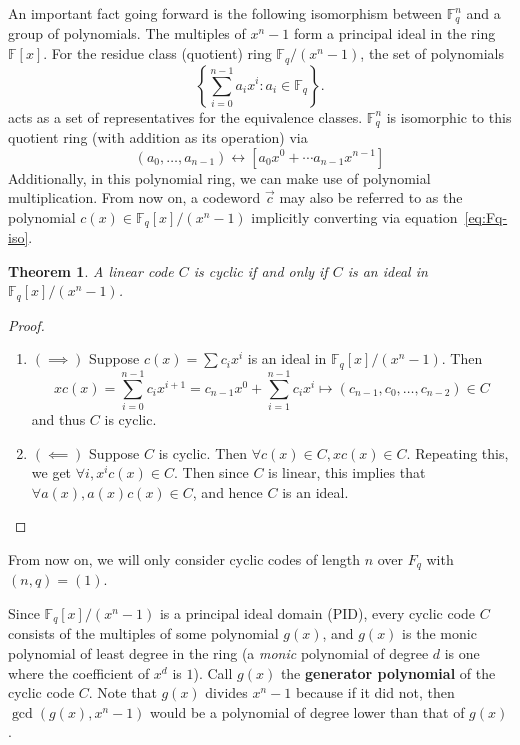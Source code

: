 \documentclass{article}
\newcommand{\F}{\mathbb{F}}
\newcommand{\mt}{\mapsto}
\renewcommand{\=}{\equiv}
\newcommand{\set}[1]{\left\{ #1 \right\}}
\renewcommand{\v}{\vec}
\theoremstyle{plain}
\newtheorem{thm}{Theorem}[subsection]
\theoremstyle{definition}
\begin{document}
An important fact going forward is the following isomorphism between $\F_q^n$ and a group of polynomials.
The multiples of $x^n - 1$ form a principal ideal in the ring $\F[x]$.
For the residue class (quotient) ring $\F_q / (x^n - 1)$, the set of polynomials
$$ \set{ \sum_{i=0}^{n-1} a_i x^i : a_i \in \F_q }. $$
acts as a set of representatives for the equivalence classes.
$\F_q^n$ is isomorphic to this quotient ring (with addition as its operation) via
\begin{equation}
  \label{eq:Fq-iso}
  (a_0, \dots, a_{n-1}) \leftrightarrow [a_0 x^0 + \cdots a_{n-1} x^{n-1}]
\end{equation}
Additionally, in this polynomial ring, we can make use of polynomial multiplication.
From now on, a codeword $\v c$ may also be referred to as the polynomial $c(x) \in \F_q[x] / (x^n-1)$ implicitly converting via equation~\ref{eq:Fq-iso}.

\begin{thm}
  A linear code $C$ is cyclic if and only if $C$ is an ideal in $\F_q[x]/(x^n-1)$.
\end{thm}
\begin{proof}\hspace{0em}
\begin{enumerate}
\item[]
$(\implies)$
Suppose $c(x) = \sum c_i x^i$ is an ideal in $\F_q[x]/(x^n-1)$.
Then
$$ x c(x) = \sum_{i=0}^{n-1} c_i x^{i+1} = c_{n-1} x^0 + \sum_{i=1}^{n-1} c_i x^{i} \mt (c_{n-1}, c_0, \dots, c_{n-2}) \in C $$
and thus $C$ is cyclic.

\item[]
$(\impliedby)$
Suppose $C$ is cyclic.
Then $\forall c(x) \in C, x c(x) \in C$.
Repeating this, we get $\forall i, x^i c(x) \in C$.
Then since $C$ is linear, this implies that $\forall a(x), a(x) c(x) \in C$,
and hence $C$ is an ideal.
\end{enumerate}
\end{proof}

\noindent
From now on, we will only consider cyclic codes of length $n$ over $F_q$ with $(n, q) = (1)$.
\vspace{1em}

Since $\F_q[x]/(x^n-1)$ is a principal ideal domain (PID), every cyclic code $C$ consists of the multiples of some polynomial $g(x)$, and $g(x)$ is the monic polynomial of least degree in the ring (a \textit{monic} polynomial of degree $d$ is one where the coefficient of $x^d$ is $1$).
Call $g(x)$ the \textbf{generator polynomial} of the cyclic code $C$.
Note that $g(x)$ divides $x^n-1$ because if it did not, then $\gcd(g(x), x^n-1)$ would be a polynomial of degree lower than that of $g(x)$.
\end{document}

